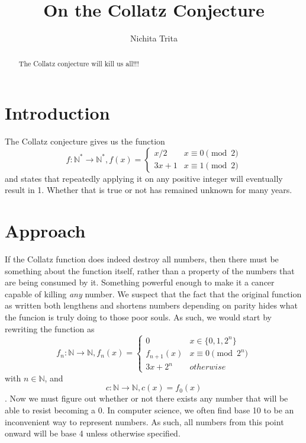 \documentclass[10pt,a4paper,showpacs,nofootinbib,aps,superscriptaddress,eqsecnum,prd,showkeys,twocolumn,notitlepage]{article}
\author{Nichita Trita}
\title{On the Collatz Conjecture}
\begin{document}
\begin{abstract}
The Collatz conjecture will kill us all!!!
\end{abstract}

\maketitle

\section{Introduction}

The Collatz conjecture gives us the function 
\[f : \mathbb{N}^{*} \rightarrow \mathbb{N}^{*}, f(x) = 
\begin{cases}
	x / 2 & x\equiv 0 \pmod 2\\
	3x + 1 & x\equiv 1 \pmod 2
\end{cases}\] and states that repeatedly applying it on any positive integer will eventually result in 1. Whether that is true or not has remained unknown for many years.

\section{Approach}

If the Collatz function does indeed destroy all numbers, then there must be something about the function itself, rather than a property of the numbers that are being consumed by it. Something powerful enough to make it a cancer capable of killing \textit{any} number.     
We suspect that the fact that the original function as written both lengthens and shortens numbers depending on parity hides what the funcion is truly doing to those poor souls. As such, we would start by rewriting the function as 
\[f_{n} : \mathbb{N} \rightarrow \mathbb{N}, 
f_{n}(x) = 
\begin{cases}
0 & x \in \{0, 1, 2^n\} \\
f_{n+1}(x) & x \equiv 0 \pmod {2^n} \\
3x + 2^n & otherwise
\end{cases}
\] with $n \in \mathbb{N}$, and 
\[ c : \mathbb{N} \rightarrow \mathbb{N}, c(x) = f_0(x)
\]. Now we must figure out whether or not there exists any number that will be able to resist becoming a $0$.
In computer science, we often find base 10 to be an inconvenient way to represent numbers. As such, all numbers from this point onward will be base 4 unless otherwise specified.
\end{document}
